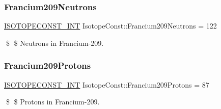 \subsubsection{\texorpdfstring{Francium209\+Neutrons}{Francium209Neutrons}}
{\footnotesize\ttfamily \mbox{\hyperlink{group___isotope_const-_macros_ga5f18360b3e99483a35c32d789e62621c}{I\+S\+O\+T\+O\+P\+E\+C\+O\+N\+S\+T\+\_\+\+I\+NT}} Isotope\+Const\+::\+Francium209\+Neutrons = 122}

\$ \$ Neutrons in Francium-\/209. \mbox{\label{group___isotope_const-_francium-_fr209_ga11655cf45c08a853a74e09ca5162feb9}} 
\subsubsection{\texorpdfstring{Francium209\+Protons}{Francium209Protons}}
{\footnotesize\ttfamily \mbox{\hyperlink{group___isotope_const-_macros_ga5f18360b3e99483a35c32d789e62621c}{I\+S\+O\+T\+O\+P\+E\+C\+O\+N\+S\+T\+\_\+\+I\+NT}} Isotope\+Const\+::\+Francium209\+Protons = 87}

\$ \$ Protons in Francium-\/209. 